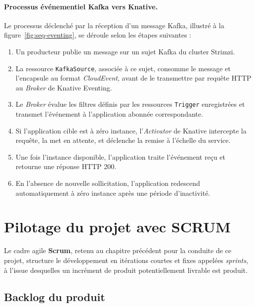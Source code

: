     
    
    \paragraph{Processus événementiel Kafka vers Knative.} Le processus déclenché par la réception d'un message Kafka, illustré à la figure~\ref{fig:seq-eventing}, se déroule selon les étapes suivantes :
    
    \begin{enumerate}
        \item Un producteur publie un message sur un sujet Kafka du cluster Strimzi.
        \item La ressource \texttt{KafkaSource}, associée à ce sujet, consomme le message et l'encapsule au format \textit{CloudEvent}, avant de le transmettre par requête HTTP au \textit{Broker} de Knative Eventing.
        \item Le \textit{Broker} évalue les filtres définis par les ressources \texttt{Trigger} enregistrées et transmet l'événement à l'application abonnée correspondante.
        \item Si l'application cible est à zéro instance, l'\textit{Activator} de Knative intercepte la requête, la met en attente, et déclenche la remise à l'échelle du service.
        \item Une fois l'instance disponible, l'application traite l'événement reçu et retourne une réponse HTTP 200.
        \item En l'absence de nouvelle sollicitation, l'application redescend automatiquement à zéro instance après une période d'inactivité.
    \end{enumerate}
    
    
    
    \section{Pilotage du projet avec SCRUM}
    \label{sec:scrum}
    
    Le cadre agile \textbf{Scrum}, retenu au chapitre précédent pour la conduite de ce projet, structure le développement en itérations courtes et fixes appelées \textit{sprints}, à l'issue desquelles un incrément de produit potentiellement livrable est produit.
    
    \subsection{Backlog du produit}
    
